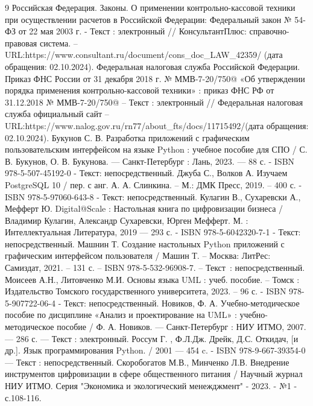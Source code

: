 
\begin{thebibliography}{9}
	 Российская Федерация. Законы. О применении контрольно-кассовой техники при осуществлении расчетов в Российской Федерации: Федеральный закон № 54-ФЗ от 22 мая 2003 г. - Текст :
	электронный // КонсультантПлюс: справочно-правовая система. – URL:https://www.consultant.ru/document/cons\_doc\_LAW\_42359/ (дата обращения: 02.10.2024).
	 Федеральная налоговая служба Российской Федерации. Приказ ФНС России от 31 декабря 2018 г. № ММВ-7-20/750@ «Об утверждении порядка применения контрольно-кассовой техники» : приказ ФНС РФ от 31.12.2018 № ММВ-7-20/750@ – Текст : электронный // Федеральная налоговая служба официальный сайт – URL:https://www.nalog.gov.ru/rn77/about\_fts/docs/11715492/(дата обращения: 02.10.2024).
     Букунов С. В. Разработка приложений с графическим пользовательским интерфейсом на языке Python : учебное пособие для СПО / С. В. Букунов, О. В. Букунова. — Санкт-Петербург : Лань, 2023. — 88 с. - ISBN 978-5-507-45192-0 - Текст: непосредственный.
     Джуба	С.,	Волков	А. Изучаем PostgreSQL 10 / пер. с анг. А. А. Слинкина. – М.: ДМК Пресс, 2019. – 400 с. - ISBN 978-5-97060-643-8 - Текст: непосредственный.
    Кулагин В., Сухаревски А., Мефферт Ю. Digital@Scale : Настольная книга по цифровизации бизнеса / Владимир Кулагин, Александр Сухаревски, Юрген Мефферт. М. : Интеллектуальная Литература, 2019 — 293 с. - ISBN 978-5-6042320-7-1 -  Текст: непосредственный.
    	Машнин Т. Создание настольных Python приложений с графическим интерфейсом пользователя / Машин Т. – Москва: ЛитРес: Самиздат, 2021. – 131 с. – ISBN 978-5-532-96908-7. – Текст~: непосредственный.
     Моисеев А.Н., Литовченко М.И. Основы языка UML : учеб. пособие. – Томск : Издательство Томского государственного университета, 2023. – 96 с. - ISBN 978-5-907722-06-4 - Текст: непосредственный.
     Новиков, Ф. А. Учебно-методическое пособие по дисциплине «Анализ и проектирование на UML» : учебно-методическое пособие / Ф. А. Новиков. — Санкт-Петербург : НИУ ИТМО, 2007. — 286 с. — Текст : электронный.
     Россум Г. , Ф.Л.Дж. Дрейк, Д.С. Откидач, [и др.]. Язык программирования Python. / 2001 — 454 c. - ISBN 978-9-667-39354-0  — Текст : непосредственный.
     Скоробогатов М.В., Минченко Л.В. Внедрение инструментов цифровизации в сфере общественного питания / Научный журнал НИУ ИТМО. Серия "Экономика и экологический менежджмент" - 2023. - №1 - с.108-116.

\end{thebibliography}
